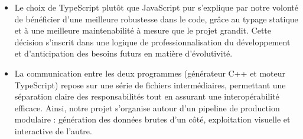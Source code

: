 \begin{itemize}
    \item Le choix de TypeScript plutôt que JavaScript pur s’explique par notre volonté de bénéficier d’une meilleure robustesse dans le code, grâce au typage statique et à une meilleure maintenabilité à mesure que le projet grandit. Cette décision s’inscrit dans une logique de professionnalisation du développement et d’anticipation des besoins futurs en matière d’évolutivité.
    \\
    \item La communication entre les deux programmes (générateur C++ et moteur TypeScript) repose sur une série de fichiers intermédiaires, permettant une séparation claire des responsabilités tout en assurant une interopérabilité efficace.
    Ainsi, notre projet s’organise autour d’un pipeline de production modulaire : génération des données brutes d’un côté, exploitation visuelle et interactive de l’autre.
\end{itemize}












